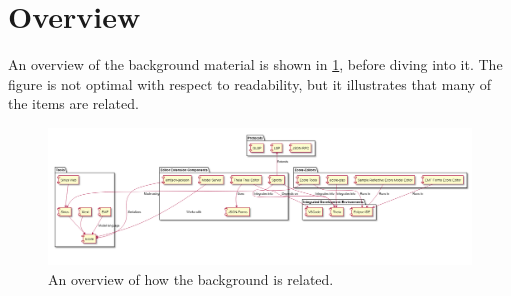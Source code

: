 \section{Overview}



An overview of the background material is shown in \cref{fig:background-overview}, before diving into it.
The figure is not optimal with respect to readability, but it illustrates that many of the items are related.

\begin{figure}[htbp]  %
  \centering
  \includegraphics[width=\textwidth]{figures/background-overview}
  \caption[Background Overview]{An overview of how the background is related.}\label{fig:background-overview}
\end{figure}